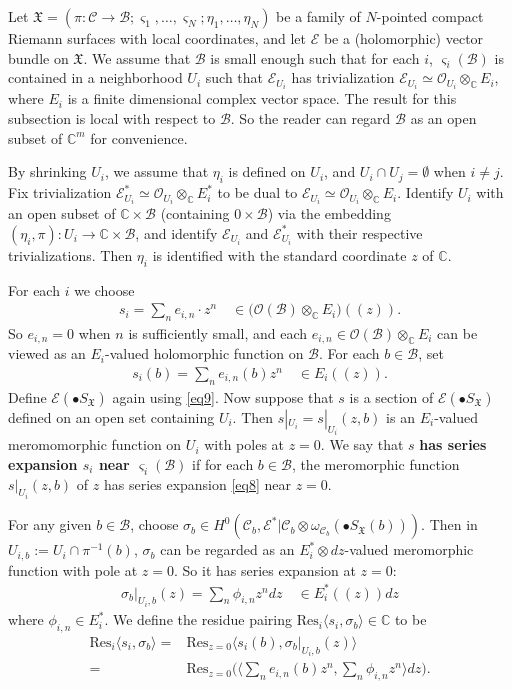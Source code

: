 \documentclass[12pt,b5paper,notitlepage]{report}
\theoremstyle{definition}
\theoremstyle{plain}
\newcommand{\fk}{\mathfrak}
\newcommand{\mc}{\mathcal}
\newcommand{\Res}{\mathrm{Res}}
\newcommand{\bk}[1]{\langle {#1}\rangle}
\newcommand{\scr}{\mathscr}
\newcommand{\sgm}{\varsigma}
\newcommand{\SX}{S_{\fk X}}
\newcommand{\mbb}{\mathbb}
\numberwithin{equation}{section}
\begin{document}
Let $\fk X=(\pi:\mc C\rightarrow\mc B;\sgm_1,\dots,\sgm_N;\eta_1,\dots,\eta_N)$ be a family of $N$-pointed compact Riemann surfaces with local coordinates, and let $\scr E$ be a (holomorphic) vector bundle on $\fk X$. We assume that $\mc B$ is small enough such that for  each $i$, $\sgm_i(\mc B)$ is contained in a neighborhood $U_i$ such that $\scr E_{U_i}$ has trivialization $\scr E_{U_i}\simeq \scr O_{U_i}\otimes_{\mathbb C}E_i$, where $E_i$ is a finite dimensional complex vector space. The result for this subsection is local with respect to $\mc B$. So the reader can regard $\mc B$ as an open subset of $\mbb C^m$ for convenience.

By shrinking $U_i$, we assume that $\eta_i$ is defined on $U_i$, and $U_i\cap U_j=\emptyset$ when $i\neq j$. Fix trivialization $\scr E^*_{U_i}\simeq \scr O_{U_i}\otimes_{\mathbb C}E_i^*$ to be dual to $\scr E_{U_i}\simeq \scr O_{U_i}\otimes_{\mathbb C}E_i$. Identify $U_i$ with an open subset of $\mathbb C\times\mc B$ (containing $0\times\mc B$) via the embedding $(\eta_i,\pi):U_i\rightarrow \mathbb C\times\mc B$, and identify $\scr E_{U_i}$ and $\scr E^*_{U_i}$ with their respective trivializations. Then $\eta_i$ is identified with the standard coordinate $z$ of $\mbb C$.

For each $i$ we choose 
\begin{align}
s_i=\sum_n e_{i,n}\cdot z^n\quad\in \big(\scr O(\mc B)\otimes_{\mathbb C}E_i\big)((z)).\label{eq10}
\end{align}
So $e_{i,n}=0$ when $n$ is sufficiently small, and each $e_{i,n}\in\scr O(\mc B)\otimes_{\mathbb C}E_i$ can be viewed as an $E_i$-valued holomorphic function on $\mc B$. For each $b\in\mc B$, set
\begin{align}
s_i(b)=\sum_n e_{i,n}(b)z^n\quad\in E_i((z)).\label{eq8}
\end{align}
Define $\scr E(\bullet\SX)$ again using \eqref{eq9}. Now suppose that $s$ is a section of $\scr E(\bullet\SX)$ defined on an open set containing $U_i$.  Then $s|_{U_i}=s|_{U_i}(z,b)$ is an $E_i$-valued meromomorphic function on $U_i$ with poles at $z=0$. We say that $s$ \textbf{has series expansion $s_i$ near $\sgm_i(\mc B)$} if for each $b\in \mc B$, the meromorphic function $s|_{U_i}(z,b)$ of $z$ has series expansion \eqref{eq8} near $z=0$.

For any given $b\in\mc B$, choose $\sigma_b\in H^0(\mc C_b,\scr E^*|\mc C_b\otimes\omega_{\mc C_b}(\bullet\SX(b)))$. Then in $U_{i,b}:=U_i\cap\pi^{-1}(b)$, $\sigma_b$ can be regarded as an $E_i^*\otimes dz$-valued meromorphic function with pole at $z=0$. So it has series expansion at $z=0$:
\begin{align}
\sigma_b|_{U_i,b}(z)=\sum_n \phi_{i,n}z^ndz \quad\in E_i^*((z))dz
\end{align}
where $\phi_{i,n}\in E_i^*$. We define the residue pairing $\Res_i\bk{s_i,\sigma_b}\in\mathbb C$ to be
\begin{align}
\Res_i \bk{s_i,\sigma_b}=&\Res_{z=0}\langle s_i(b),\sigma_b|_{U_i,b}(z) \rangle\nonumber\\
=&\Res_{z=0}\bigg(\Big\langle \sum_n e_{i,n}(b)z^n, \sum_n \phi_{i,n}z^n  \Big\rangle dz\bigg).\label{eq217}
\end{align} 
\end{document}
